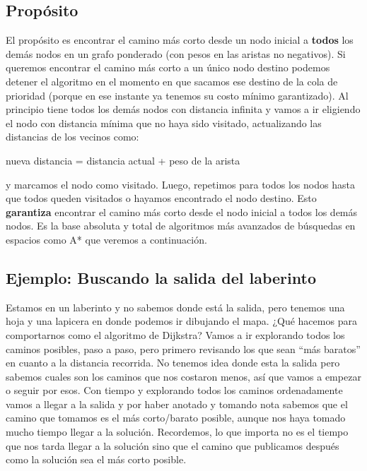\documentclass[12pt]{article}
\begin{document}
\subsection{Propósito}

El propósito es encontrar el camino más corto desde un nodo inicial a \textbf{todos} los demás nodos en un grafo ponderado (con pesos en las aristas no negativos). Si queremos encontrar el camino más corto a un único nodo destino podemos detener el algoritmo en el momento en que sacamos ese destino de la cola de prioridad (porque en ese instante ya tenemos su costo mínimo garantizado). Al principio tiene todos los demás nodos con distancia infinita y vamos a ir eligiendo el nodo con distancia mínima que no haya sido visitado, actualizando las distancias de los vecinos como:

\begin{center}
    nueva distancia = distancia actual + peso de la arista
\end{center}

y marcamos el nodo como visitado. Luego, repetimos para todos los nodos hasta que todos queden visitados o hayamos encontrado el nodo destino. Esto \textbf{garantiza} encontrar el camino más corto desde el nodo inicial a todos los demás nodos. Es la base absoluta y total de algoritmos más avanzados de búsquedas en espacios como A* que veremos a continuación.

\subsection{Ejemplo: Buscando la salida del laberinto}

Estamos en un laberinto y no sabemos donde está la salida, pero tenemos una hoja y una lapicera en donde podemos ir dibujando el mapa. ¿Qué hacemos para comportarnos como el algoritmo de Dijkstra? Vamos a ir explorando todos los caminos posibles, paso a paso, pero primero revisando los que sean ``más baratos'' en cuanto a la distancia recorrida. No tenemos idea donde esta la salida pero sabemos cuales son los caminos que nos costaron menos, así que vamos a empezar o seguir por esos. Con tiempo y explorando todos los caminos ordenadamente vamos a llegar a la salida y por haber anotado y tomando nota sabemos que el camino que tomamos es el más corto/barato posible, aunque nos haya tomado mucho tiempo llegar a la solución. Recordemos, lo que importa no es el tiempo que nos tarda llegar a la solución sino que el camino que publicamos después como la solución sea el más corto posible.
\end{document}
